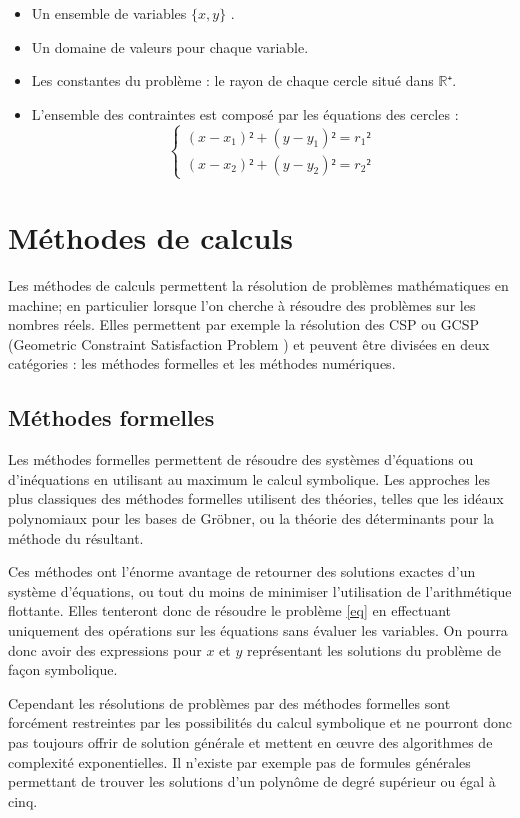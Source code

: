 \begin{itemize}
\item
Un ensemble de variables $\{x,y\}$ .
\item
Un domaine de valeurs pour chaque variable. 
\item
Les constantes du problème : le rayon de chaque cercle situé dans  $\mathbb{R⁺}$.
\item
L'ensemble des contraintes est composé par les équations des cercles :
\begin{equation}\label{eq}
\begin{cases}
(x-x_1)²+(y-y_1)² = r_1²\\
(x-x_2)²+(y-y_2)² = r_2²
\end{cases}
\end{equation}
\end{itemize}


\section{Méthodes de calculs}
Les méthodes de calculs permettent la résolution de problèmes mathématiques en machine; en particulier lorsque l'on cherche à résoudre des problèmes sur les nombres réels. Elles permettent par exemple la résolution des \textsc{CSP}  ou \textsc{GCSP} (Geometric Constraint Satisfaction Problem \cite{Jermann}) et peuvent être divisées en deux catégories : les méthodes formelles et les méthodes numériques.


\subsection{Méthodes formelles}
Les méthodes formelles permettent de résoudre des systèmes d'équations ou d'inéquations en utilisant au maximum le calcul symbolique. Les approches les plus classiques des méthodes formelles utilisent des théories, telles que les idéaux polynomiaux pour les bases de Gröbner, ou la théorie des déterminants pour la méthode du résultant.

 Ces méthodes ont l'énorme avantage de retourner des solutions exactes d'un système d'équations, ou tout du moins de minimiser l'utilisation de l'arithmétique flottante. Elles tenteront donc de résoudre le problème \ref{eq} en effectuant uniquement des opérations sur les équations sans évaluer les variables. On pourra donc avoir des expressions pour $x$ et $y$ représentant les solutions du problème de façon symbolique. 

Cependant les résolutions de problèmes par des méthodes formelles sont forcément restreintes par les possibilités du calcul symbolique et ne pourront donc pas toujours offrir de solution générale et mettent en œuvre des algorithmes de complexité exponentielles. Il n'existe par exemple pas de formules générales permettant de trouver les solutions d'un polynôme de degré supérieur ou égal à cinq.


